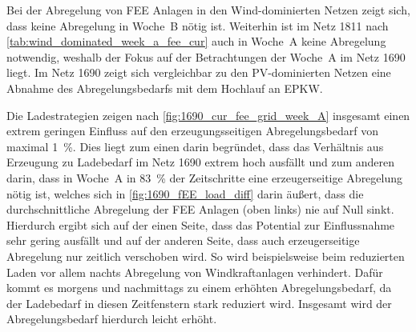 

Bei der Abregelung von \gls{FEE} Anlagen in den Wind-dominierten Netzen zeigt sich, dass keine Abregelung in Woche~B nötig ist.
Weiterhin ist im Netz \num{1811} nach \autoref{tab:wind_dominated_week_a_fee_cur} auch in Woche~A keine Abregelung notwendig, weshalb der Fokus auf der Betrachtungen der Woche~A im Netz \num{1690} liegt.
Im Netz \num{1690} zeigt sich vergleichbar zu den \gls{PV}-dominierten Netzen eine Abnahme des Abregelungsbedarfs mit dem Hochlauf an \gls{EPKW}.\medskip

Die Ladestrategien zeigen nach \autoref{fig:1690_cur_fee_grid_week_A} insgesamt einen extrem geringen Einfluss auf den erzeugungsseitigen Abregelungsbedarf von maximal \SI{1}{\percent}.
Dies liegt zum einen darin begründet, dass das Verhältnis aus Erzeugung zu Ladebedarf im Netz \num{1690} extrem hoch ausfällt und zum anderen darin, dass in Woche~A in \SI{83}{\percent} der Zeitschritte eine erzeugerseitige Abregelung nötig ist, welches sich in \autoref{fig:1690_fEE_load_diff} darin äußert, dass die durchschnittliche Abregelung der \gls{FEE} Anlagen (oben links) nie auf Null sinkt.
Hierdurch ergibt sich auf der einen Seite, dass das Potential zur Einflussnahme sehr gering ausfällt und auf der anderen Seite, dass auch erzeugerseitige Abregelung nur zeitlich verschoben wird.
So wird beispielsweise beim reduzierten Laden vor allem nachts Abregelung von Windkraftanlagen verhindert.
Dafür kommt es morgens und nachmittags zu einem erhöhten Abregelungsbedarf, da der Ladebedarf in diesen Zeitfenstern stark reduziert wird.
Insgesamt wird der Abregelungsbedarf hierdurch leicht erhöht.



